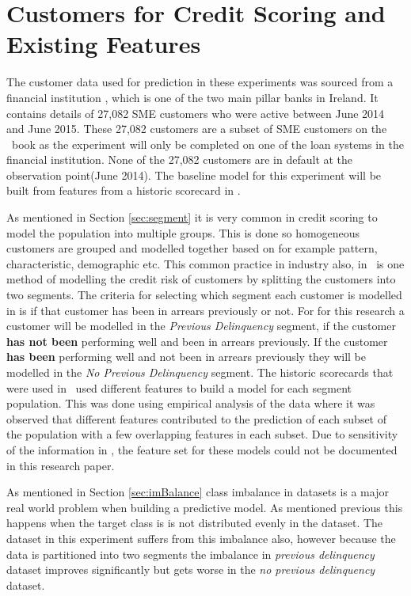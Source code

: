 \section{Customers for Credit Scoring and Existing Features}

The customer data used for prediction in these experiments was sourced from a financial institution \subjectname, which is one of the two main pillar banks in Ireland. It contains details of 27,082 SME customers who were active between June 2014 and June 2015. These 27,082 customers are a subset of SME customers on the \subjectname\ book as the experiment will only be completed on one of the loan systems in the financial institution. None of the 27,082 customers are in default at the observation point(June 2014). The baseline model for this experiment will be built from features from a historic scorecard in \subjectname.

As mentioned in Section \ref{sec:segment} it is very common in credit scoring to model the population into multiple groups. This is done so homogeneous customers are grouped and modelled together based on for example pattern, characteristic, demographic etc. This common practice in industry also, in \subjectname\ is one method of modelling the credit risk of customers by splitting the customers into two segments. The criteria for selecting which segment each customer is modelled in is if that customer has been in arrears previously or not. For for this research a customer will be modelled in the \textit{Previous Delinquency} segment, if the customer \textbf{has not been} performing well and been in arrears previously. If the customer \textbf{has been } performing well and not been in arrears previously they will be modelled in the \textit{No Previous Delinquency} segment. The historic scorecards that were used in \subjectname\ used different features to build a model for each segment population. This was done using empirical analysis of the data where it was observed that different features contributed to the prediction of each subset of the population with a few overlapping features in each subset. Due to sensitivity of the information in \subjectname, the feature set for these models could not be documented in this research paper.

As mentioned in Section \ref{sec:imBalance} class imbalance in datasets is a major real world problem when building a predictive model. As mentioned previous this happens when the target class is is not distributed evenly in the dataset. The dataset in this experiment suffers from this imbalance also, however because the data is partitioned into two segments the imbalance in \textit{previous delinquency} dataset improves significantly but gets worse in the \textit{no previous delinquency} dataset.

